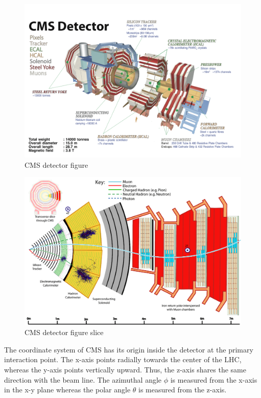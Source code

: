 \begin{figure}
  \includegraphics[width=\hugefigwidth]{chap_CMSDetector_figures/CMS}
  \caption[CMS Detector figure]%
  {CMS detector figure}
  \label{fig:CMSFigure}
\end{figure}



\begin{figure}
  \includegraphics[width=\hugefigwidth]{chap_CMSDetector_figures/cms_slice}
  \caption[CMS Detector Slice figure]%
  {CMS detector figure slice}
  \label{fig:CMSFigureSlice}
\end{figure}

The coordinate system of CMS has its origin inside the detector at the primary
interaction point. The x-axis points radially towards the center of the
LHC, whereas the y-axis points vertically upward. Thus, the z-axis shares the
same direction with the beam line. The azimuthal angle $\phi$ is measured from
the x-axis in the x-y plane whereas the polar angle $\theta$ is measured from the z-axis.

